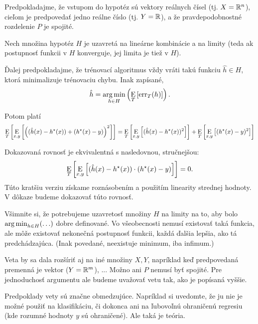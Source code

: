 \begin{theorem}
  Predpokladajme, že vstupom do hypotéz sú vektory reálnych čísel
  (tj. $X = \mathbb{R}^n$), cieľom je predpovedať jedno reálne číslo
  (tj. $Y = \mathbb{R}$), a že pravdepodobnostné rozdelenie $P$ je spojité.
  
  Nech množina hypotéz $H$ je uzavretá na lineárne kombinácie a na
  limity (teda ak postupnosť funkcii v $H$ konverguje, jej limita
  je tiež v $H$).
  
  Ďalej predpokladajme, že trénovací algoritmus vždy vráti takú funkciu
  $\hat{h} \in H$, ktorá minimalizuje trénovaciu chybu. Inak zapísané,
  $$\hat{h} = \operatorname*{arg\,min}_{h \in H} \left( \operatorname*{\mathrm{E}}_T \left[ \mathrm{err}_T(h) \right] \right).$$
  
  Potom platí
  $$\operatorname*{\mathrm{E}}_T \left[ \operatorname*{\mathrm{E}}_{x,y} \left[ \left( (\hat{h}(x) - h^\star(x)) + (h^\star(x) - y) \right)^2 \right] \right] = \operatorname*{\mathrm{E}}_T \left[ \operatorname*{\mathrm{E}}_{x,y} \left[ (\hat{h}(x) - h^\star(x))^2 \right] \right] + \operatorname*{\mathrm{E}}_T \left[ \operatorname*{\mathrm{E}}_{x,y} \left[ (h^\star(x) - y)^2 \right] \right]$$
\end{theorem}
\begin{remark}
  Dokazovaná rovnosť je ekvivalentná s nasledovnou, stručnejšou:
  $$\operatorname*{\mathrm{E}}_T \left[ \operatorname*{\mathrm{E}}_{x, y} \left[ (\hat{h}(x) - h^\star(x)) \cdot (h^\star(x) - y) \right] \right] = 0.$$
  Túto kratšiu verziu získame roznásobením a použitím linearity strednej
  hodnoty. V dôkaze budeme dokazovať túto rovnosť.
\end{remark}
\begin{remark}
  Všimnite si, že potrebujeme uzavretosť množiny $H$ na limity na to,
  aby bolo $\operatorname*{arg\,min}_{h \in H} (\ldots)$ dobre definované. Vo všeobecnosti
  nemusí existovať taká funkcia, ale môže existovať nekonečná postupnosť
  funkcii, každá ďalšia lepšia, ako tá predchádzajúca. (Inak povedané,
  neexistuje minimum, iba infimum.)
\end{remark}
\begin{remark}
  Veta by sa dala rozšíriť aj na iné množiny $X, Y$, napríklad keď
  predpovedaná premenná je vektor ($Y = \mathbb{R}^m$), ... Možno ani $P$
  nemusí byť spojité. Pre jednoduchosť argumentu ale budeme uvažovať
  vetu tak, ako je popísaná vyššie.
\end{remark}
\begin{remark}
  Predpoklady vety sú značne obmedzujúce. Napríklad si uvedomte, že
  ju nie je možné použiť na klasifikáciu, či dokonca ani na ľubovoľnú
  ohraničenú regresiu (kde rozumné hodnoty $y$ sú ohraničené). Ale taká
  je teória.
\end{remark}

